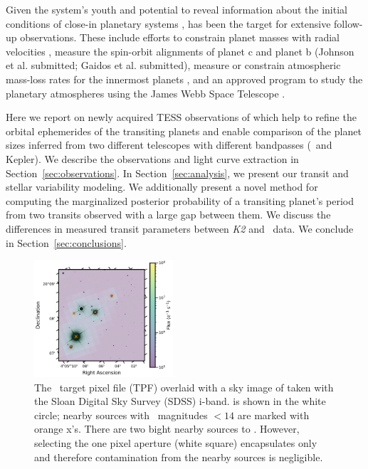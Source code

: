 \documentclass[twocolumn]{aastex631}
\begin{document}
Given the system's youth and potential to reveal information about the initial conditions of close-in planetary systems \citep[e.g.][]{Poppenhaeger2021, Owen2020}, \sname has been the target for extensive follow-up observations. These include efforts to constrain planet masses with radial velocities \citep{Beichman2019}, measure the spin-orbit alignments of planet c \citep{Feinstein21} and planet b (Johnson et al. submitted; Gaidos et al. submitted), measure or constrain atmospheric mass-loss rates for the innermost planets \citep{Schlawin21, Vissapragada21}, and an approved program to study the planetary atmospheres using the James Webb Space Telescope \citep{Desert2021}.


Here we report on newly acquired TESS observations of \sname which help to refine the orbital ephemerides of the transiting planets and enable comparison of the planet sizes inferred from two different telescopes with different bandpasses (\tess\ and Kepler). We describe the observations and light curve extraction in Section~\ref{sec:observations}. In Section~\ref{sec:analysis}, we present our transit and stellar variability modeling. We additionally present a novel method for computing the marginalized posterior probability of a transiting planet's period from two transits observed with a large gap between them. We discuss the differences in measured transit parameters between \textit{K2} and \tess\ data. We conclude in Section~\ref{sec:conclusions}.

\begin{figure}[!ht]
\begin{center}
\includegraphics[width=0.46\textwidth,trim={0.25cm 0 0 0}]{static/TESSaperture.pdf}
\caption{The \tess\ target pixel file (TPF) overlaid with a sky image of \sname taken with the Sloan Digital Sky Survey (SDSS) i-band. \sname is shown in the white circle; nearby sources with \tess\ magnitudes $< 14$ are marked with orange x's. There are two bight nearby sources to \sname. However, selecting the one pixel aperture (white square) encapsulates only \sname and therefore contamination from the nearby sources is negligible. \href{https://github.com/afeinstein20/v1298tau_tess/blob/main/src/figures/tpf.py}{\github}} \label{fig:tpf}
\end{center}
\end{figure}
\end{document}
